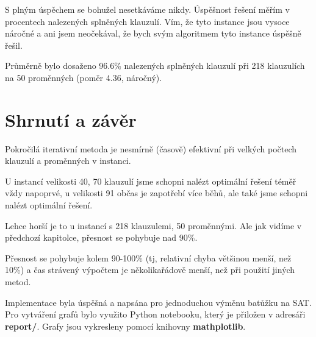 \documentclass[a4paper,10pt,twocolumn]{article}
\begin{document}
\begin{itemize}
\begin{itemize}
S plným úspěchem se bohužel nesetkáváme nikdy. Úspěšnost řešení měřím v procentech nalezených splněných klauzulí. Vím, že tyto instance jsou vysoce náročné a ani jsem neočekával, že bych svým algoritmem tyto instance úspěšně řešil.

Průměrně bylo dosaženo 96.6\% nalezených splněných klauzulí při 218 klauzulích na 50 proměnných (poměr 4.36, náročný).

\section{Shrnutí a závěr}

Pokročilá iterativní metoda je nesmírně (časově) efektivní při velkých počtech klauzulí a proměnných v instanci.

U instancí velikosti 40, 70 klauzulí jsme schopni nalézt optimální řešení téměř vždy napoprvé, u velikosti 91 občas je zapotřebí více běhů, ale také jsme schopni nalézt optimální řešení. 


Lehce horší je to u instancí s 218 klauzulemi, 50 proměnnými. Ale jak vidíme v předchozí kapitolce, přesnost se pohybuje nad 90\%.

Přesnost se pohybuje kolem 90-100\% (tj, relativní chyba většinou menší, než 10\%) a čas strávený výpočtem je několikařádově menší, než při použití jiných metod.

Implementace byla úspěšná a napsána pro jednoduchou výměnu batůžku  na SAT. \\
Pro vytváření grafů bylo využito Python notebooku, který je přiložen v adresáři \textbf{report/}. Grafy jsou vykresleny pomocí knihovny \textbf{mathplotlib}.








\end{itemize}
\end{itemize}
\end{document}
